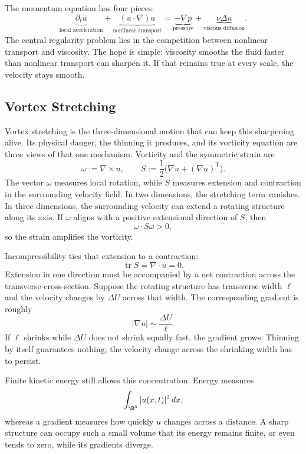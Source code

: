 
The momentum equation has four pieces:
\[
  \underbrace{\partial_t u}_{\text{local acceleration}}
  +
  \underbrace{(u\cdot\nabla)u}_{\text{nonlinear transport}}
  =
  \underbrace{-\nabla p}_{\text{pressure}}
  +
  \underbrace{\nu\Delta u}_{\text{viscous diffusion}}.
\]
The central regularity problem lies in the competition between nonlinear transport and viscosity.
The hope is simple: viscosity smooths the fluid faster than nonlinear transport can sharpen it.
If that remains true at every scale, the velocity stays smooth.

\subsection{Vortex Stretching}\label{sub:ThePerfectlyStretchingVortex}

Vortex stretching is the three-dimensional motion that can keep this sharpening alive.
Its physical danger, the thinning it produces, and its vorticity equation are three views of that one mechanism.
Vorticity and the symmetric strain are
\[
  \omega:=\nabla\times u,
  \qquad
  S:=\frac12\bigl(\nabla u+(\nabla u)^{\mathsf T}\bigr).
\]
The vector \(\omega\) measures local rotation, while \(S\) measures extension and contraction in the surrounding velocity field.
In two dimensions, the stretching term vanishes.
In three dimensions, the surrounding velocity can extend a rotating structure along its axis.
If \(\omega\) aligns with a positive extensional direction of \(S\), then
\[
  \omega\cdot S\omega>0,
\]
so the strain amplifies the vorticity.

Incompressibility ties that extension to a contraction:
\[
  \operatorname{tr}S=\nabla\cdot u=0.
\]
Extension in one direction must be accompanied by a net contraction across the transverse cross-section.
Suppose the rotating structure has transverse width \(\ell\) and the velocity changes by \(\Delta U\) across that width.
The corresponding gradient is roughly
\[
  |\nabla u|\sim\frac{\Delta U}{\ell}.
\]
If \(\ell\) shrinks while \(\Delta U\) does not shrink equally fast, the gradient grows.
Thinning by itself guarantees nothing; the velocity change across the shrinking width has to persist.

Finite kinetic energy still allows this concentration.
Energy measures
\[
  \int_{\R^3}|u(x,t)|^2\,dx,
\]
whereas a gradient measures how quickly \(u\) changes across a distance.
A sharp structure can occupy such a small volume that its energy remains finite, or even tends to zero, while its gradients diverge.

